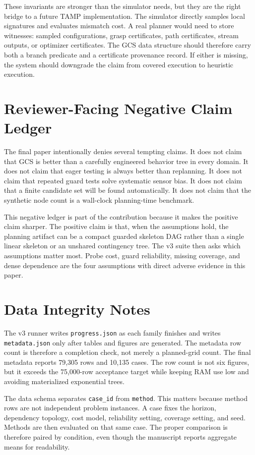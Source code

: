\documentclass{article}
\begin{document}
These invariants are stronger than the simulator needs, but they are the right bridge to a future TAMP implementation. The simulator directly samples local signatures and evaluates mismatch cost. A real planner would need to store witnesses: sampled configurations, grasp certificates, path certificates, stream outputs, or optimizer certificates. The GCS data structure should therefore carry both a branch predicate and a certificate provenance record. If either is missing, the system should downgrade the claim from covered execution to heuristic execution.

\section{Reviewer-Facing Negative Claim Ledger}
The final paper intentionally denies several tempting claims. It does not claim that GCS is better than a carefully engineered behavior tree in every domain. It does not claim that eager testing is always better than replanning. It does not claim that repeated guard tests solve systematic sensor bias. It does not claim that a finite candidate set will be found automatically. It does not claim that the synthetic node count is a wall-clock planning-time benchmark.

This negative ledger is part of the contribution because it makes the positive claim sharper. The positive claim is that, when the assumptions hold, the planning artifact can be a compact guarded skeleton DAG rather than a single linear skeleton or an unshared contingency tree. The v3 suite then asks which assumptions matter most. Probe cost, guard reliability, missing coverage, and dense dependence are the four assumptions with direct adverse evidence in this paper.

\section{Data Integrity Notes}
The v3 runner writes \texttt{progress.json} as each family finishes and writes \texttt{metadata.json} only after tables and figures are generated. The metadata row count is therefore a completion check, not merely a planned-grid count. The final metadata reports 79,305 rows and 10,135 cases. The row count is not six figures, but it exceeds the 75,000-row acceptance target while keeping RAM use low and avoiding materialized exponential trees.

The data schema separates \texttt{case\_id} from \texttt{method}. This matters because method rows are not independent problem instances. A case fixes the horizon, dependency topology, cost model, reliability setting, coverage setting, and seed. Methods are then evaluated on that same case. The proper comparison is therefore paired by condition, even though the manuscript reports aggregate means for readability.
\end{document}
